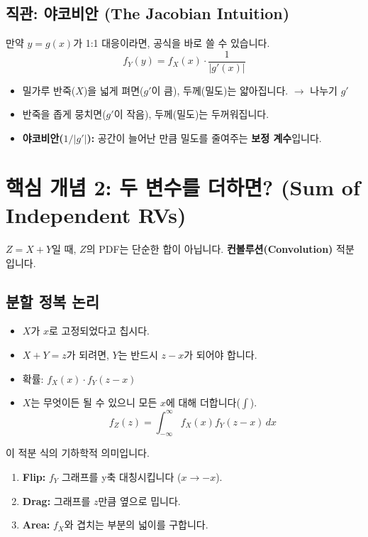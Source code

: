 \documentclass[11pt,a4paper]{book}
\theoremstyle{definition}
\begin{document}
\subsection{직관: 야코비안 (The Jacobian Intuition)}
만약 $y=g(x)$가 1:1 대응이라면, 공식을 바로 쓸 수 있습니다.
\[ f_Y(y) = f_X(x) \cdot \frac{1}{|g'(x)|} \]

\begin{conceptbox}[title={밀가루 반죽 비유}]
\begin{itemize}
    \item 밀가루 반죽($X$)을 넓게 펴면($g'$이 큼), 두께(밀도)는 얇아집니다. $\to$ 나누기 $g'$
    \item 반죽을 좁게 뭉치면($g'$이 작음), 두께(밀도)는 두꺼워집니다.
    \item \textbf{야코비안($1/|g'|$):} 공간이 늘어난 만큼 밀도를 줄여주는 \textbf{보정 계수}입니다.
\end{itemize}
\end{conceptbox}

\section{핵심 개념 2: 두 변수를 더하면? (Sum of Independent RVs)}

$Z = X + Y$일 때, $Z$의 PDF는 단순한 합이 아닙니다. \textbf{컨볼루션(Convolution)} 적분입니다.


\subsection{분할 정복 논리}
\begin{itemize}
    \item $X$가 $x$로 고정되었다고 칩시다.
    \item $X+Y=z$가 되려면, $Y$는 반드시 $z-x$가 되어야 합니다.
    \item 확률: $f_X(x) \cdot f_Y(z-x)$
    \item $X$는 무엇이든 될 수 있으니 모든 $x$에 대해 더합니다($\int$).
    \[ f_Z(z) = \int_{-\infty}^{\infty} f_X(x) f_Y(z-x) \, dx \]
\end{itemize}

\begin{conceptbox}[title={Flip and Drag (뒤집고 밀기)}]
이 적분 식의 기하학적 의미입니다.
\begin{enumerate}
    \item \textbf{Flip:} $f_Y$ 그래프를 y축 대칭시킵니다 ($x \to -x$).
    \item \textbf{Drag:} 그래프를 $z$만큼 옆으로 밉니다.
    \item \textbf{Area:} $f_X$와 겹치는 부분의 넓이를 구합니다.
\end{enumerate}
\end{conceptbox}
\end{document}
